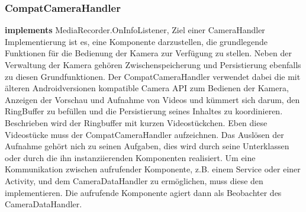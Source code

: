 \subsubsection{CompatCameraHandler} \label{app:klasse:CompatCameraHandler}
\textbf{implements} MediaRecorder.OnInfoListener,  \newline
Ziel einer CameraHandler Implementierung ist es, eine Komponente darzustellen, die grundlegende Funktionen für die Bedienung der Kamera zur Verfügung zu stellen. Neben der Verwaltung der Kamera gehören Zwischenspeicherung und Persistierung ebenfalls zu diesen Grundfunktionen. Der CompatCameraHandler verwendet dabei die mit älteren Androidversionen kompatible Camera API zum Bedienen der Kamera, Anzeigen der Vorschau und Aufnahme von Videos und kümmert sich darum, den RingBuffer zu befüllen und die Persistierung seines Inhaltes zu koordinieren. Beschrieben wird der Ringbuffer mit kurzen Videostückchen. Eben diese Videostücke muss der CompatCameraHandler aufzeichnen.
Das Auslösen der Aufnahme gehört nich zu seinen Aufgaben, dies wird durch seine Unterklassen oder durch die ihn instanziierenden Komponenten realisiert. Um eine Kommunikation zwischen aufrufender Komponente, z.B. einem Service oder einer Activity, und dem CameraDataHandler zu ermöglichen, muss diese den  implementieren. Die aufrufende Komponente agiert dann als Beobachter des CameraDataHandler.
\newline

